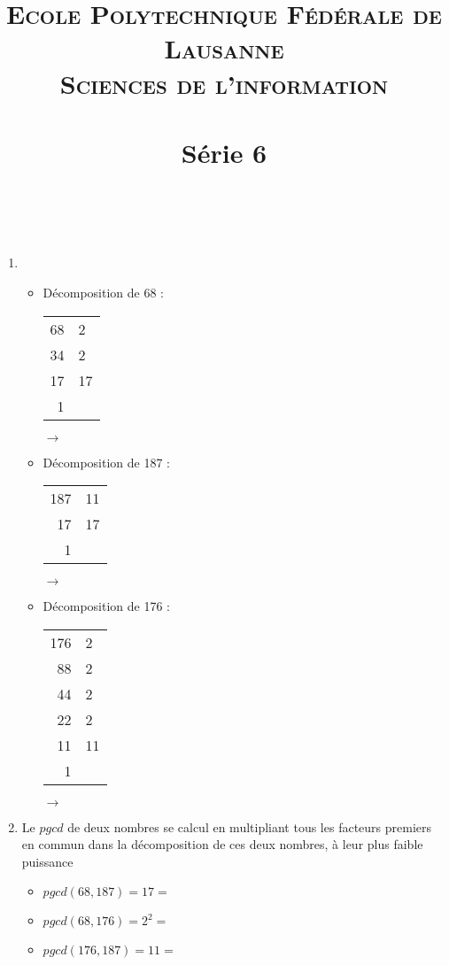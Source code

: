 \documentclass[10p,a4paper]{scrartcl}
\title{	
\normalfont \normalsize 
\textsc{Ecole Polytechnique Fédérale de Lausanne} \\ [25pt] %
\textsc{Sciences de l'information}\\ [0pt] %
\horrule{0.5pt} \\[0.4cm] %
\huge Série 6 \\ %
\horrule{2pt} \\[0.5cm] %
}
\date{}
\begin{document}
\maketitle
\setcounter{section}{6}
\subsection{}
\begin{enumerate}
	\item 	\begin{itemize}
				\item 	Décomposition de 68 :
						\begin{tabular}{r|l}
							68 & 2\\
							34 & 2\\
							17 & 17\\
							1
						\end{tabular}
						$\to$ 
					
				\item 	Décomposition de 187 : 
						\begin{tabular}{r|l}
							187 & 11\\
							17 & 17\\
							1
						\end{tabular}
						$\to$ 
			
				\item 	Décomposition de 176 :
						\begin{tabular}{r|l}
							176 & 2\\
							88 & 2\\
							44 & 2\\
							22 & 2\\
							11 & 11\\
							1
						\end{tabular}
						$\to$ 
			\end{itemize}
			
	\item 	Le $pgcd$ de deux nombres se calcul en multipliant tous les facteurs premiers en commun dans la décomposition de ces deux nombres, à leur plus faible puissance
			\begin{itemize}
				\item 	$pgcd(68,187) = 17 =$ 
				\item 	$pgcd(68,176) = 2^2 =$ 
				\item 	$pgcd(176,187) = 11=$ 
			\end{itemize}
			

\end{enumerate}
\end{document}
